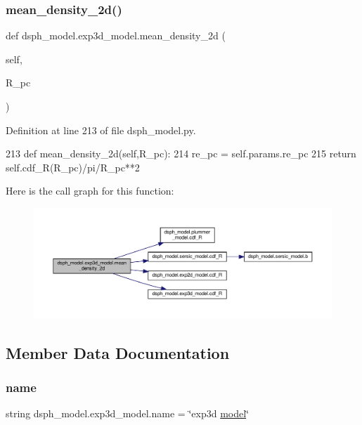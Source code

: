 \subsubsection{\texorpdfstring{mean\+\_\+density\+\_\+2d()}{mean\_density\_2d()}}
{\footnotesize\ttfamily def dsph\+\_\+model.\+exp3d\+\_\+model.\+mean\+\_\+density\+\_\+2d (\begin{DoxyParamCaption}\item[{}]{self,  }\item[{}]{R\+\_\+pc }\end{DoxyParamCaption})}



Definition at line 213 of file dsph\+\_\+model.\+py.


\begin{DoxyCode}
213     \textcolor{keyword}{def }mean\_density\_2d(self,R\_pc):
214         re\_pc = self.params.re\_pc
215         \textcolor{keywordflow}{return} self.cdf\_R(R\_pc)/pi/R\_pc**2
\end{DoxyCode}
Here is the call graph for this function\+:\nopagebreak
\begin{figure}[H]
\begin{center}
\leavevmode
\includegraphics[width=350pt]{dc/d37/classdsph__model_1_1exp3d__model_a0dae92e16b158e09e47517706236f83d_cgraph}
\end{center}
\end{figure}


\subsection{Member Data Documentation}
\mbox{\label{classdsph__model_1_1exp3d__model_aa4b03ab39c5b9408f14b2ca594f8aebd}} 
\subsubsection{\texorpdfstring{name}{name}}
{\footnotesize\ttfamily string dsph\+\_\+model.\+exp3d\+\_\+model.\+name = \char`\"{}exp3d \hyperlink{classdsph__model_1_1model}{model}\char`\"{}\hspace{0.3cm}{\ttfamily [static]}}



